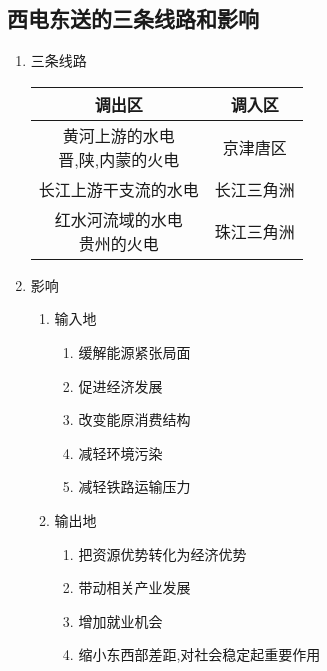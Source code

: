 \documentclass[a4paper]{article}
\begin{document}
    \subsection{西电东送的三条线路和影响}
    \begin{enumerate}
        \item 三条线路\\
            \begin{tabular}{|c|c|}
                \hline
                调出区  &   调入区  \\
                \hline
                \makecell[c]{黄河上游的水电\\晋,陕,内蒙的火电}  &   京津唐区    \\
                \hline
                长江上游干支流的水电    &   长江三角洲  \\
                \hline
                \makecell[c]{红水河流域的水电\\贵州的火电}  &   珠江三角洲  \\
                \hline
            \end{tabular}
        \item 影响
        \begin{enumerate}
            \item 输入地
            \begin{enumerate}
                \item 缓解能源紧张局面
                \item 促进经济发展
                \item 改变能原消费结构
                \item 减轻环境污染
                \item 减轻铁路运输压力
            \end{enumerate}
            \item 输出地
            \begin{enumerate}
                \item 把资源优势转化为经济优势
                \item 带动相关产业发展
                \item 增加就业机会
                \item 缩小东西部差距,对社会稳定起重要作用
            \end{enumerate}
        \end{enumerate}
    \end{enumerate}
\end{document}

